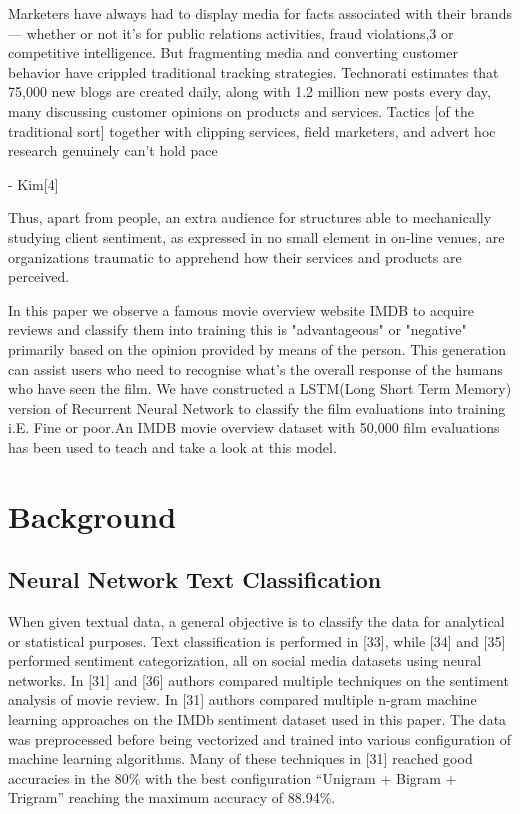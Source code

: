 \documentclass[conference]{IEEEtran}
\begin{document}
Marketers have always had to display media for facts associated with their brands — whether or not it’s for public relations activities, fraud violations,3 or competitive intelligence. But fragmenting media and converting customer behavior have crippled traditional tracking strategies. Technorati estimates that 75,000 new blogs are created daily, along with 1.2 million new posts every day, many discussing customer opinions on products and services. Tactics [of the traditional sort] together with clipping services, field marketers, and advert hoc research genuinely can’t hold pace

 - Kim[4]

 Thus, apart from people, an extra audience for structures able to mechanically studying client sentiment, as expressed in no small element in on-line venues, are organizations traumatic to apprehend how their services and products are perceived.

 In this paper we observe a famous movie overview website IMDB to acquire reviews and classify them into  training this is "advantageous" or "negative" primarily based on the opinion provided by means of the person. This generation can assist users who need to recognise what's the overall response of the humans who have seen the film. We have constructed a LSTM(Long Short Term Memory) version of Recurrent Neural Network to classify the film evaluations into  training i.E. Fine or poor.An IMDB movie overview dataset with 50,000 film evaluations has been used to teach and take a look at this model.

\section{Background}

\subsection{Neural Network Text Classification}\label{AA}

 When given textual data, a general objective is to classify
the data for analytical or statistical purposes. Text
classification is performed in [33], while [34] and [35]
performed sentiment categorization, all on social media datasets
using neural networks. In [31] and [36] authors compared
multiple techniques on the sentiment analysis
of movie review. In [31] authors compared multiple n-gram
machine learning approaches on the IMDb sentiment
dataset used in this paper. The data was preprocessed before
being vectorized and trained into various configuration of machine
learning algorithms. Many of these techniques in [31] reached
good accuracies in the 80\% with the best configuration
“Unigram + Bigram + Trigram” reaching the maximum
accuracy of 88.94\%. 
\end{document}
